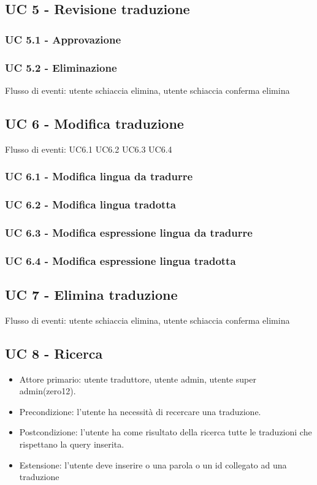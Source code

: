 \subsection*{UC 5 - Revisione traduzione}
    \subsubsection*{UC 5.1 - Approvazione}
    \subsubsection*{UC 5.2 - Eliminazione}
    Flusso di eventi: utente schiaccia elimina, utente schiaccia conferma elimina
\subsection*{UC 6 - Modifica traduzione}
Flusso di eventi: UC6.1 UC6.2 UC6.3 UC6.4   %
    \subsubsection*{UC 6.1 - Modifica lingua da tradurre}
    \subsubsection*{UC 6.2 - Modifica lingua tradotta}
    \subsubsection*{UC 6.3 - Modifica espressione lingua da tradurre}
    \subsubsection*{UC 6.4 - Modifica espressione lingua tradotta}
\subsection*{UC 7 - Elimina traduzione} %
Flusso di eventi: utente schiaccia elimina, utente schiaccia conferma elimina
\subsection*{UC 8 - Ricerca}
    \begin{itemize}
        \item Attore primario: utente traduttore, utente admin, utente super admin(zero12).
        \item Precondizione: l'utente ha necessità di recercare una traduzione.
        \item Postcondizione: l'utente ha come risultato della ricerca tutte le traduzioni che rispettano la query inserita.
        \item Estensione: l'utente deve inserire o una parola o un id collegato ad una traduzione
    \end{itemize}
